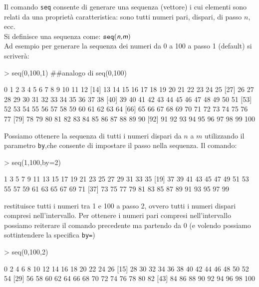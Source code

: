 \documentclass[onecolumn,11pt]{book}
\newcommand{\varia}[1]{\textsl{\textsf{#1}}}
\begin{document}
Il comando \texttt{seq} consente di generare una sequenza (vettore) i cui elementi sono relati da una propriet\`a caratteristica: sono tutti numeri pari, dispari, di passo $n$, ecc.\\
Si definisce una sequenza come: $\texttt{seq}(\varia{n,m})$\\ %
Ad esempio per generare la sequenza dei numeri da 0 a 100 a passo 1 (default) si scriver\`a:
\begin{Schunk}
\begin{Sinput}
> seq(0,100,1) ##analogo di seq(0,100)
\end{Sinput}
\begin{Soutput}
  [1]   0   1   2   3   4   5   6   7   8   9  10  11  12
 [14]  13  14  15  16  17  18  19  20  21  22  23  24  25
 [27]  26  27  28  29  30  31  32  33  34  35  36  37  38
 [40]  39  40  41  42  43  44  45  46  47  48  49  50  51
 [53]  52  53  54  55  56  57  58  59  60  61  62  63  64
 [66]  65  66  67  68  69  70  71  72  73  74  75  76  77
 [79]  78  79  80  81  82  83  84  85  86  87  88  89  90
 [92]  91  92  93  94  95  96  97  98  99 100
\end{Soutput}
\end{Schunk}
Possiamo ottenere la sequenza di tutti i numeri dispari da $n$ a $m$ utilizzando il parametro \texttt{by},che consente di impostare il passo nella sequenza.
Il comando:  
\begin{Schunk}
\begin{Sinput}
> seq(1,100,by=2)
\end{Sinput}
\begin{Soutput}
 [1]  1  3  5  7  9 11 13 15 17 19 21 23 25 27 29 31 33 35
[19] 37 39 41 43 45 47 49 51 53 55 57 59 61 63 65 67 69 71
[37] 73 75 77 79 81 83 85 87 89 91 93 95 97 99
\end{Soutput}
\end{Schunk}
restituisce tutti i numeri tra 1 e 100 a passo 2, ovvero tutti i numeri dispari compresi nell'intervallo. 
Per ottenere i numeri pari compresi nell'intervallo possiamo reiterare il comando precedente ma partendo da 0 (e volendo possiamo sottintendere la specifica \texttt{by=})
\begin{Schunk}
\begin{Sinput}
> seq(0,100,2)
\end{Sinput}
\begin{Soutput}
 [1]   0   2   4   6   8  10  12  14  16  18  20  22  24  26
[15]  28  30  32  34  36  38  40  42  44  46  48  50  52  54
[29]  56  58  60  62  64  66  68  70  72  74  76  78  80  82
[43]  84  86  88  90  92  94  96  98 100
\end{Soutput}
\end{Schunk}
\end{document}
